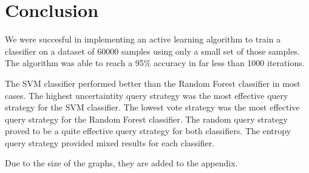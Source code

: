 
\section{Conclusion}

We were succesful in implementing an active learning algorithm to train a classifier on a dataset of 60000 samples using only a small set of those samples. 
The algorithm was able to reach a 95\% accuracy in far less than 1000 iterations.\par
The SVM classifier performed better than the Random Forest classifier in most cases. 
The highest uncertaintity query strategy was the most effective query strategy for the SVM classifier. 
The lowest vote strategy was the most effective query strategy for the Random Forest classifier. The random query strategy proved to be a quite effective query strategy for both classifiers. 
The entropy query strategy provided mixed results for each classifier.\par
Due to the size of the graphs, they are added to the appendix.